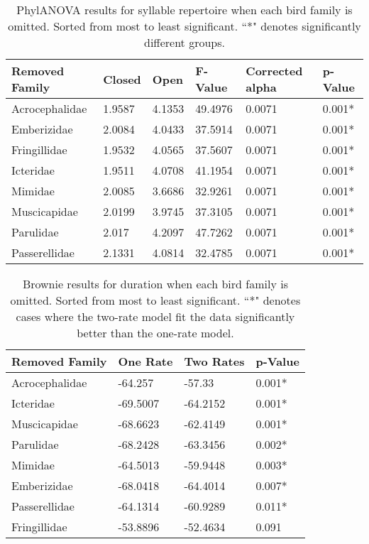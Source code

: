 \documentclass[a4paper,12pt]{article}
\begin{document}
\begin{table}[ht]
\caption{PhylANOVA results for syllable repertoire when each bird family is omitted.  Sorted from most to least significant.  ``*" denotes significantly different groups.}
\centering
\begin{tabular}{llllll}
  \hline
Removed Family & Closed & Open & F-Value & Corrected alpha & p-Value \\ 
  \hline
Acrocephalidae & 1.9587 & 4.1353 & 49.4976 & 0.0071 & 0.001* \\ 
  Emberizidae & 2.0084 & 4.0433 & 37.5914 & 0.0071 & 0.001* \\ 
  Fringillidae & 1.9532 & 4.0565 & 37.5607 & 0.0071 & 0.001* \\ 
  Icteridae & 1.9511 & 4.0708 & 41.1954 & 0.0071 & 0.001* \\ 
  Mimidae & 2.0085 & 3.6686 & 32.9261 & 0.0071 & 0.001* \\ 
  Muscicapidae & 2.0199 & 3.9745 & 37.3105 & 0.0071 & 0.001* \\ 
  Parulidae & 2.017 & 4.2097 & 47.7262 & 0.0071 & 0.001* \\ 
  Passerellidae & 2.1331 & 4.0814 & 32.4785 & 0.0071 & 0.001* \\ 
   \hline
\end{tabular}
\end{table}

\begin{table}[ht]
\caption{Brownie results for duration when each bird family is omitted.  Sorted from most to least significant.  ``*" denotes cases where the two-rate model fit the data significantly better than the one-rate model.}
\centering
\begin{tabular}{llll}
  \hline
Removed Family & One Rate & Two Rates & p-Value \\ 
  \hline
Acrocephalidae & -64.257 & -57.33 & 0.001* \\ 
  Icteridae & -69.5007 & -64.2152 & 0.001* \\ 
  Muscicapidae & -68.6623 & -62.4149 & 0.001* \\ 
  Parulidae & -68.2428 & -63.3456 & 0.002* \\ 
  Mimidae & -64.5013 & -59.9448 & 0.003* \\ 
  Emberizidae & -68.0418 & -64.4014 & 0.007* \\ 
  Passerellidae & -64.1314 & -60.9289 & 0.011* \\ 
  Fringillidae & -53.8896 & -52.4634 & 0.091 \\ 
   \hline
\end{tabular}
\end{table}
\end{document}
